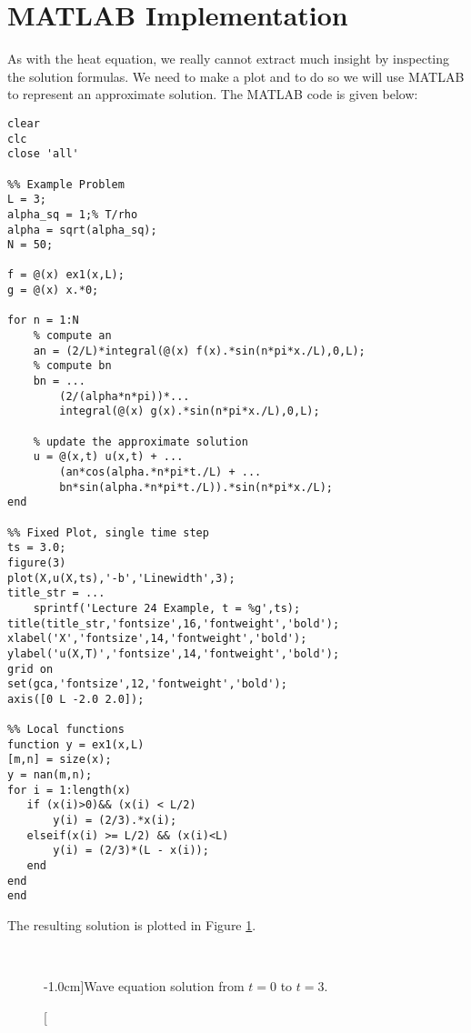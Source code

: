 \section{MATLAB Implementation}
As with the heat equation, we really cannot extract much insight by inspecting the solution formulas.  We need to make a plot and to do so we will use MATLAB to represent an approximate solution.
The MATLAB code is given below:
\begin{lstlisting}[name=lec24_ex, style=myMatlab]
clear
clc
close 'all'

%% Example Problem
L = 3;
alpha_sq = 1;% T/rho
alpha = sqrt(alpha_sq);
N = 50;

f = @(x) ex1(x,L);
g = @(x) x.*0;

for n = 1:N
    % compute an
    an = (2/L)*integral(@(x) f(x).*sin(n*pi*x./L),0,L);
    % compute bn
    bn = ...
        (2/(alpha*n*pi))*...
        integral(@(x) g(x).*sin(n*pi*x./L),0,L);
    
    % update the approximate solution
    u = @(x,t) u(x,t) + ...
        (an*cos(alpha.*n*pi*t./L) + ...
        bn*sin(alpha.*n*pi*t./L)).*sin(n*pi*x./L); 
end

%% Fixed Plot, single time step
ts = 3.0;
figure(3)
plot(X,u(X,ts),'-b','Linewidth',3);
title_str = ...
    sprintf('Lecture 24 Example, t = %g',ts);
title(title_str,'fontsize',16,'fontweight','bold');
xlabel('X','fontsize',14,'fontweight','bold');
ylabel('u(X,T)','fontsize',14,'fontweight','bold');
grid on
set(gca,'fontsize',12,'fontweight','bold');
axis([0 L -2.0 2.0]);

%% Local functions
function y = ex1(x,L)
[m,n] = size(x);
y = nan(m,n);
for i = 1:length(x)
   if (x(i)>0)&& (x(i) < L/2)
       y(i) = (2/3).*x(i);
   elseif(x(i) >= L/2) && (x(i)<L)
       y(i) = (2/3)*(L - x(i));
   end
end
end
\end{lstlisting}
The resulting solution is plotted in Figure \ref{fig:lec24-ex1}.
\begin{fullwidth}
\begin{figure}
\\
\label{fig:lec24-ex1}
\caption[][-1.0cm]{Wave equation solution from $t=0$ to $t=3$.}
\end{figure}
\end{fullwidth}

